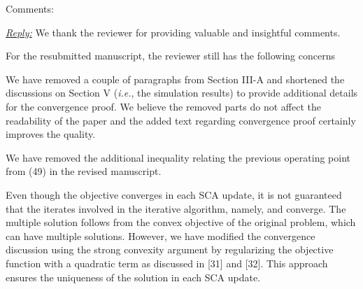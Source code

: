 Comments:

\vspace{1eM}
\underline{\textit{Reply:}} We thank the reviewer for providing valuable and insightful comments.

\vspace{1eM}
For the resubmitted manuscript, the reviewer still has the following concerns

\begin{enumerate}
 

\resp We have removed a couple of paragraphs from Section III-A and shortened the discussions on Section V (\textit{i.e.}, the simulation results) to provide additional details for the convergence proof. We believe the removed parts do not affect the readability of the paper and the added text regarding convergence proof certainly improves the quality. 

 

\resp We have removed the additional inequality relating the previous operating point from (49) in the revised manuscript. 

 

\resp  Even though the objective converges in each \ac{SCA} update, it is not guaranteed that the iterates involved in the iterative algorithm, namely,  and  converge. The multiple solution follows from the convex objective of the original problem, which can have multiple solutions. However, we have modified the convergence discussion using the strong convexity argument by regularizing the objective function with a quadratic term as discussed in [31] and [32]. This approach ensures the uniqueness of the solution in each \ac{SCA} update. 


\end{enumerate}
